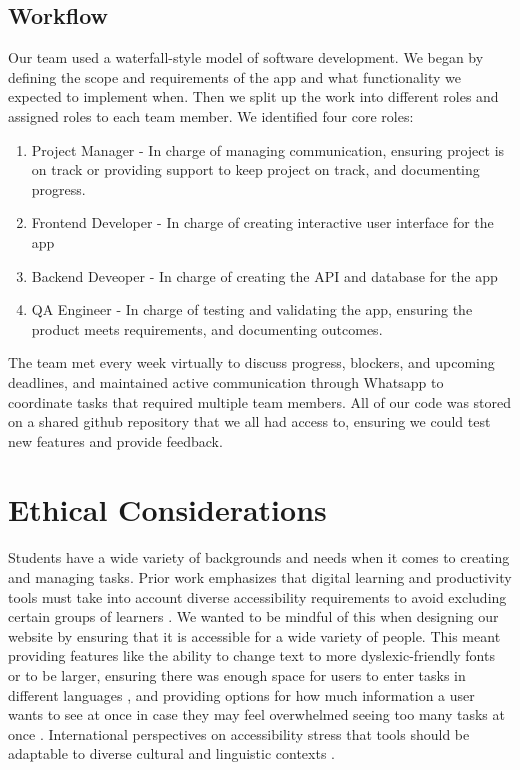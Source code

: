 \documentclass[11pt,oneside]{article}
\begin{document}
\subsection{Workflow}
Our team used a waterfall-style model of software development. We began by defining the scope and requirements of the app and what functionality we expected to implement when. Then we split up the work into different roles and assigned roles to each team member. We identified four core roles:

\begin{enumerate}
\item Project Manager - In charge of managing communication, ensuring project is on track or providing support to keep project on track, and documenting progress.
\item Frontend Developer - In charge of creating interactive user interface for the app
\item Backend Deveoper - In charge of creating the API and database for the app
\item QA Engineer - In charge of testing and validating the app, ensuring the product meets requirements, and documenting outcomes.
\end{enumerate}

The team met every week virtually to discuss progress, blockers, and upcoming deadlines, and maintained active communication through Whatsapp to coordinate tasks that required multiple team members. All of our code was stored on a shared github repository that we all had access to, ensuring we could test new features and provide feedback.

\section{Ethical Considerations}
Students have a wide variety of backgrounds and needs when it comes to creating and managing tasks. Prior work emphasizes that digital learning and productivity tools must take into account diverse accessibility requirements to avoid excluding certain groups of learners \citep{seale2013learning}. We wanted to be mindful of this when designing our website by ensuring that it is accessible for a wide variety of people. This meant providing features like the ability to change text to more dyslexic-friendly fonts or to be larger, ensuring there was enough space for users to enter tasks in different languages \citep{al2016universal}, and providing options for how much information a user wants to see at once in case they may feel overwhelmed seeing too many tasks at once \citep{spina2019wcag}. International perspectives on accessibility stress that tools should be adaptable to diverse cultural and linguistic contexts \citep{world2011world}.
\end{document}
